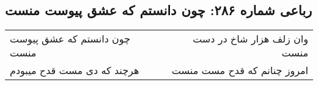 \begin{center}
\section*{رباعی شماره ۲۸۶: چون دانستم که عشق پیوست منست}
\label{sec:0286}
\begin{longtable}{l p{0.5cm} r}
چون دانستم که عشق پیوست منست
&&
وان زلف هزار شاخ در دست منست
\\
هرچند که دی مست قدح میبودم
&&
امروز چنانم که قدح مست منست
\\
\end{longtable}
\end{center}

